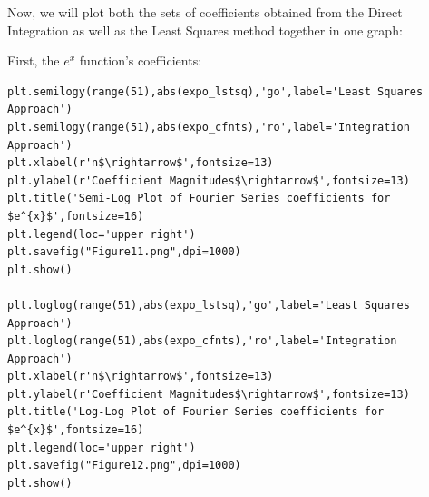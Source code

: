 \documentclass[12pt]{article}
\begin{document}
Now, we will plot both the sets of coefficients obtained from the Direct Integration as well as the Least Squares method together in one graph:

\bigskip
\bigskip

First, the $e^x$ function's coefficients:

\begin{lstlisting}
plt.semilogy(range(51),abs(expo_lstsq),'go',label='Least Squares Approach')
plt.semilogy(range(51),abs(expo_cfnts),'ro',label='Integration Approach')
plt.xlabel(r'n$\rightarrow$',fontsize=13)
plt.ylabel(r'Coefficient Magnitudes$\rightarrow$',fontsize=13)
plt.title('Semi-Log Plot of Fourier Series coefficients for $e^{x}$',fontsize=16)
plt.legend(loc='upper right')
plt.savefig("Figure11.png",dpi=1000)
plt.show()

plt.loglog(range(51),abs(expo_lstsq),'go',label='Least Squares Approach')
plt.loglog(range(51),abs(expo_cfnts),'ro',label='Integration Approach')
plt.xlabel(r'n$\rightarrow$',fontsize=13)
plt.ylabel(r'Coefficient Magnitudes$\rightarrow$',fontsize=13)
plt.title('Log-Log Plot of Fourier Series coefficients for $e^{x}$',fontsize=16)
plt.legend(loc='upper right')
plt.savefig("Figure12.png",dpi=1000)
plt.show()
\end{lstlisting}
\end{document}
